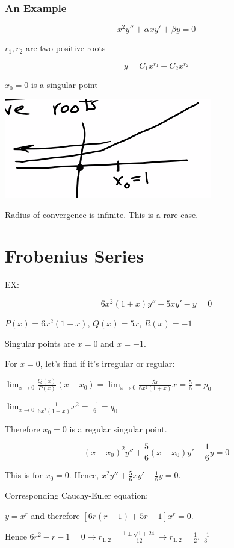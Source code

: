\subsubsection{An Example}

$$x^2 y'' + \alpha x y' + \beta y = 0$$

$r_1, r_2$ are two positive roots

$$y = C_1 x^{r_1} + C_2 x^{r_2}$$

$x_0 = 0$ is a singular point

\includegraphics[width = 0.4 \textwidth]{image3.png}

Radius of convergence is infinite. This is a rare case. 

\section{Frobenius Series}

EX: 

$$ 6x^2 (1+x) y'' + 5xy' - y = 0$$

$P(x) = 6x^2 (1+x)$, $Q(x) = 5x$, $R(x) = -1$

Singular points are $x = 0$ and $x = -1$. 

For $x = 0$, let's find if it's irregular or regular:

$\lim_{x \to 0} \frac{Q(x)}{P(x)}(x - x_0) = \lim_{x \to 0} \frac{5x}{6x^2 (1+x)} x = \frac{5}{6} = p_0$

$\lim_{x \to 0} \frac{-1}{6x^2 (1+x)} x^2 = \frac{-1}{6} = q_0$

Therefore $x_0 = 0$ is a regular singular point. 

$$(x - x_0)^2 y'' + \frac{5}{6} (x - x_0) y' - \frac{1}{6} y = 0$$

This is for $x_0 = 0$. Hence, $x^2 y'' + \frac{5}{6} x y' - \frac{1}{6} y = 0$. 

\hfill \break 

Corresponding Cauchy-Euler equation:

$y = x^r$ and therefore $\left[ 6r(r-1) + 5r - 1 \right] x^r = 0$. 

Hence $6r^2 - r - 1 = 0 \longrightarrow r_{1,2} = \frac{1 \pm \sqrt{1+24}}{12} \longrightarrow r_{1,2} = \frac{1}{2}, \frac{-1}{3}$

